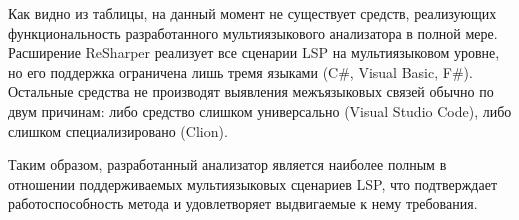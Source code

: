Как видно из таблицы, на данный момент не существует средств, реализующих функциональность разработанного мультиязыкового
анализатора в полной мере. Расширение ReSharper реализует все сценарии LSP на мультиязыковом уровне, но
его поддержка ограничена лишь тремя языками (C\#, Visual Basic, F\#). Остальные средства не 
производят выявления межъязыковых связей обычно по двум причинам: либо средство слишком универсально
(Visual Studio Code), либо слишком специализировано (Clion).

Таким образом, разработанный анализатор является наиболее полным в отношении
поддерживаемых мультиязыковых сценариев LSP, что подтверждает работоспособность
метода и удовлетворяет выдвигаемые к нему требования.

\clearpage